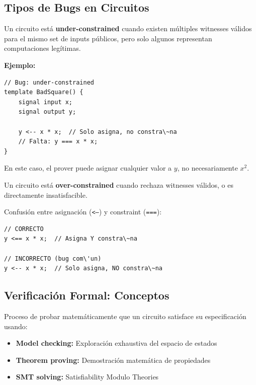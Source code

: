 \documentclass[11pt,a4paper,twoside]{book}
\begin{document}
\subsection{Tipos de Bugs en Circuitos}

\begin{definition}
Un circuito est\'a \textbf{under-constrained} cuando existen m\'ultiples witnesses v\'alidos para el mismo set de inputs p\'ublicos, pero solo algunos representan computaciones leg\'itimas.

\textbf{Ejemplo:}
\begin{verbatim}
// Bug: under-constrained
template BadSquare() {
    signal input x;
    signal output y;
    
    y <-- x * x;  // Solo asigna, no constra\~na
    // Falta: y === x * x;
}
\end{verbatim}

En este caso, el prover puede asignar cualquier valor a $y$, no necesariamente $x^2$.
\end{definition}

\begin{definition}
Un circuito est\'a \textbf{over-constrained} cuando rechaza witnesses v\'alidos, o es directamente insatisfacible.
\end{definition}

\begin{definition}
Confusi\'on entre asignaci\'on (\texttt{<--}) y constraint (\texttt{===}):

\begin{verbatim}
// CORRECTO
y <== x * x;  // Asigna Y constra\~na

// INCORRECTO (bug com\'un)
y <-- x * x;  // Solo asigna, NO constra\~na
\end{verbatim}
\end{definition}

\subsection{Verificaci\'on Formal: Conceptos}

\begin{definition}
Proceso de probar matem\'aticamente que un circuito satisface su especificaci\'on usando:
\begin{itemize}
    \item \textbf{Model checking:} Exploraci\'on exhaustiva del espacio de estados
    \item \textbf{Theorem proving:} Demostraci\'on matem\'atica de propiedades
    \item \textbf{SMT solving:} Satisfiability Modulo Theories
\end{itemize}
\end{definition}
\end{document}
